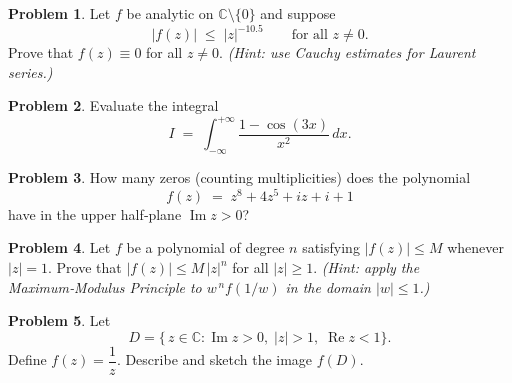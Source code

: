 \documentclass[10pt]{article}
\theoremstyle{definition} %
\newtheorem{problem}{Problem}
\theoremstyle{plain} %
\begin{document}
                          \begin{problem}
                          Let \(f\) be analytic on \(\mathbb{C}\setminus\{0\}\) and suppose
                          \[
                            \lvert f(z)\rvert \;\le\; \lvert z\rvert^{-10.5}
                            \qquad\text{for all } z\neq 0.
                          \]
                          Prove that \(f(z)\equiv 0\) for all \(z\neq 0\).  
                          \emph{(Hint: use Cauchy estimates for Laurent series.)}
                          \end{problem}
                          \begin{problem}
                            Evaluate the integral
                            \[
                              I \;=\; \int_{-\infty}^{+\infty} \frac{1-\cos(3x)}{x^{2}}\,dx.
                            \]
                            \end{problem}
                            
                            \begin{problem}
                            How many zeros (counting multiplicities) does the polynomial
                            \[
                              f(z)\;=\;z^{8}+4z^{5}+iz+i+1
                            \]
                            have in the upper half‑plane \(\operatorname{Im}z>0\)?
                            \end{problem}
                            
                            \begin{problem}
                            Let \(f\) be a polynomial of degree \(n\) satisfying \(\lvert f(z)\rvert\le M\) whenever \(\lvert z\rvert=1\).  
                            Prove that \(\lvert f(z)\rvert\le M\,\lvert z\rvert^{n}\) for all \(\lvert z\rvert\ge 1\).  
                            \emph{(Hint: apply the Maximum‑Modulus Principle to \(w^{\,n}f(1/w)\) in the domain \(\lvert w\rvert\le 1\).)}
                            \end{problem}
                            
                            \begin{problem}
                            Let
                            \[
                              D=\bigl\{\,z\in\mathbb{C} : \operatorname{Im}z>0,\; \lvert z\rvert>1,\; \operatorname{Re}z<1 \bigr\}.
                            \]
                            Define \(f(z)=\dfrac{1}{z}\).  
                            Describe and sketch the image \(f(D)\).
                            \end{problem}
                            
\end{document}
